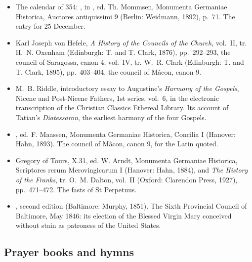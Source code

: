 \begin{itemize}[leftmargin=1.3em, itemsep=0.3em]
\item The calendar of 354: , in , ed. Th. Mommsen, Monumenta Germaniae Historica, Auctores antiquissimi 9 (Berlin:
Weidmann, 1892), p.~71. The entry for 25 December.
\item Karl Joseph von Hefele, \textit{A History of the Councils of the Church}, vol.~II, tr.
H.~N. Oxenham (Edinburgh: T. and T. Clark, 1876), pp.~292--293, the council of Saragossa, canon 4;
vol.~IV, tr. W.~R. Clark (Edinburgh: T. and T. Clark, 1895), pp.~403--404, the council of Mâcon,
canon 9.
\item M.~B. Riddle, introductory essay to Augustine's \textit{Harmony of the Gospels}, Nicene
and Post-Nicene Fathers, 1st series, vol.~6, in the electronic transcription of the Christian
Classics Ethereal Library. Its account of Tatian's \textit{Diatessaron}, the earliest harmony of
the four Gospels.
\item {}, ed. F. Maassen, Monumenta Germaniae Historica, Concilia I
(Hanover: Hahn, 1893). The council of Mâcon, canon 9, for the Latin quoted.
\item Gregory of Tours,  X.31, ed. W. Arndt, Monumenta Germaniae
Historica, Scriptores rerum Merovingicarum I (Hanover: Hahn, 1884), and \textit{The History of the
Franks}, tr. O.~M. Dalton, vol.~II (Oxford: Clarendon Press, 1927), pp.~471--472. The fasts of
St Perpetuus.
\item {}, second
edition (Baltimore: Murphy, 1851). The Sixth Provincial Council of Baltimore, May 1846: its
election of the Blessed Virgin Mary conceived without stain as patroness of the United States.
\end{itemize}

\subsection{Prayer books and hymns}

